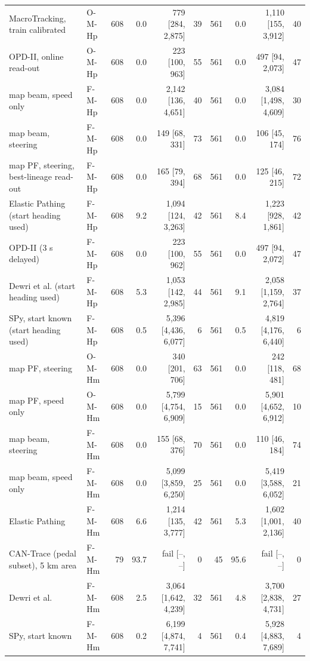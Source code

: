 \begin{table}[t]
\begin{tabular}{llrrrrrrrr}
MacroTracking, train calibrated & O-M-Hp & 608 & 0.0 & 779 [284, 2{,}875] & 39 & 561 & 0.0 & 1{,}110 [155, 3{,}912] & 40 \\
OPD-II, online read-out & O-M-Hp & 608 & 0.0 & 223 [100, 963] & 55 & 561 & 0.0 & 497 [94, 2{,}073] & 47 \\
map beam, speed only & F-M-Hp & 608 & 0.0 & 2{,}142 [136, 4{,}651] & 40 & 561 & 0.0 & 3{,}084 [1{,}498, 4{,}609] & 30 \\
map beam, steering & F-M-Hp & 608 & 0.0 & 149 [68, 331] & 73 & 561 & 0.0 & 106 [45, 174] & 76 \\
map PF, steering, best-lineage read-out & F-M-Hp & 608 & 0.0 & 165 [79, 394] & 68 & 561 & 0.0 & 125 [46, 215] & 72 \\
Elastic Pathing (start heading used) & F-M-Hp & 608 & 9.2 & 1{,}094 [124, 3{,}263] & 42 & 561 & 8.4 & 1{,}223 [928, 1{,}861] & 42 \\
OPD-II (3 s delayed) & F-M-Hp & 608 & 0.0 & 223 [100, 962] & 55 & 561 & 0.0 & 497 [94, 2{,}072] & 47 \\
Dewri et al. (start heading used) & F-M-Hp & 608 & 5.3 & 1{,}053 [142, 2{,}985] & 44 & 561 & 9.1 & 2{,}058 [1{,}159, 2{,}764] & 37 \\
SPy, start known (start heading used) & F-M-Hp & 608 & 0.5 & 5{,}396 [4{,}436, 6{,}077] & 6 & 561 & 0.5 & 4{,}819 [4{,}176, 6{,}440] & 6 \\
map PF, steering & O-M-Hm & 608 & 0.0 & 340 [201, 706] & 63 & 561 & 0.0 & 242 [118, 481] & 68 \\
map PF, speed only & O-M-Hm & 608 & 0.0 & 5{,}799 [4{,}754, 6{,}909] & 15 & 561 & 0.0 & 5{,}901 [4{,}652, 6{,}912] & 10 \\
map beam, steering & F-M-Hm & 608 & 0.0 & 155 [68, 376] & 70 & 561 & 0.0 & 110 [46, 184] & 74 \\
map beam, speed only & F-M-Hm & 608 & 0.0 & 5{,}099 [3{,}859, 6{,}250] & 25 & 561 & 0.0 & 5{,}419 [3{,}588, 6{,}052] & 21 \\
Elastic Pathing & F-M-Hm & 608 & 6.6 & 1{,}214 [135, 3{,}777] & 42 & 561 & 5.3 & 1{,}602 [1{,}001, 2{,}136] & 40 \\
CAN-Trace (pedal subset), 5 km area & F-M-Hm & 79 & 93.7 & fail [--, --] & 0 & 45 & 95.6 & fail [--, --] & 0 \\
Dewri et al. & F-M-Hm & 608 & 2.5 & 3{,}064 [1{,}642, 4{,}239] & 32 & 561 & 4.8 & 3{,}700 [2{,}838, 4{,}731] & 27 \\
SPy, start known & F-M-Hm & 608 & 0.2 & 6{,}199 [4{,}874, 7{,}741] & 4 & 561 & 0.4 & 5{,}928 [4{,}883, 7{,}689] & 4 \\

\end{tabular}
\end{table}
